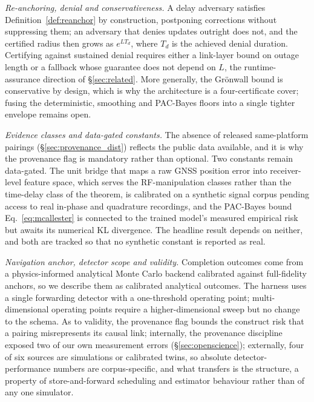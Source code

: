 \documentclass[conference,letterpaper,10pt]{IEEEtran}   %
\begin{document}
\emph{Re-anchoring, denial and conservativeness.} A delay adversary satisfies
Definition~\ref{def:reanchor} by construction, postponing corrections without
suppressing them; an adversary that denies updates outright does not, and the
certified radius then grows as $e^{LT_d}$, where $T_d$ is the achieved denial
duration. Certifying against sustained denial requires either a link-layer
bound on outage length or a fallback whose guarantee does not depend on $L$,
the runtime-assurance direction of \S\ref{sec:related}. More generally, the
Gr\"onwall bound is conservative by design, which is why the architecture is a
four-certificate cover; fusing the deterministic, smoothing and PAC-Bayes floors
into a single tighter envelope remains open.

\emph{Evidence classes and data-gated constants.} The absence of released
same-platform pairings (\S\ref{sec:provenance_dist}) reflects the public data
available, and it is why the provenance flag is mandatory rather than optional.
Two constants remain data-gated. The unit bridge that maps a raw GNSS position
error into receiver-level feature space, which serves the RF-manipulation
classes rather than the time-delay class of the theorem, is calibrated on a
synthetic signal corpus pending access to real in-phase and quadrature
recordings, and the PAC-Bayes bound Eq.~\eqref{eq:mcallester} is connected to
the trained model's measured empirical risk but awaits its numerical KL
divergence. The headline result depends on neither, and both are tracked so
that no synthetic constant is reported as real.

\emph{Navigation anchor, detector scope and validity.} Completion outcomes come
from a physics-informed analytical Monte Carlo backend calibrated against
full-fidelity anchors, so we describe them as calibrated analytical outcomes. The harness uses a single forwarding detector with a one-threshold
operating point; multi-dimensional operating points require a
higher-dimensional sweep but no change to the schema. As to validity, the
provenance flag bounds the construct risk that a pairing misrepresents its
causal link; internally, the provenance discipline exposed two of our own
measurement errors (\S\ref{sec:openscience}); externally, four of six sources are simulations or calibrated twins, so absolute
detector-performance numbers are corpus-specific, and what transfers is the
structure, a property of store-and-forward scheduling and estimator behaviour
rather than of any one simulator.

\end{document}
